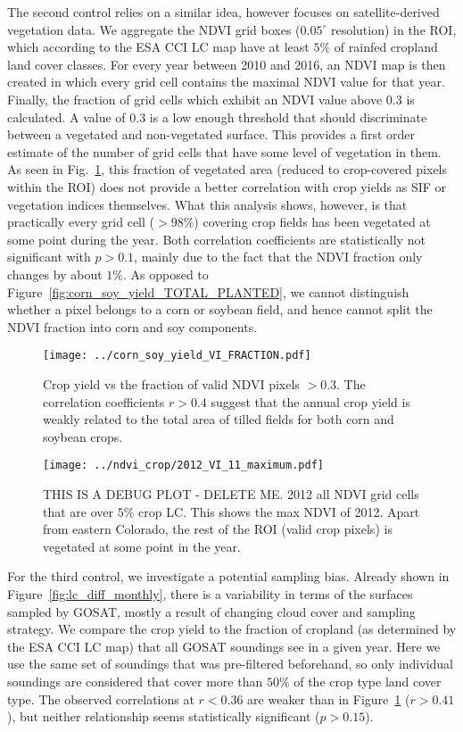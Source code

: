 \documentclass[preprint, a4paper, 10pt, times, 5p]{elsarticle}
\begin{document}
The second control relies on a similar idea, however focuses on satellite-derived vegetation data. We aggregate the NDVI grid boxes ($0.05^\circ$ resolution) in the ROI, which according to the ESA CCI LC map have at least $5\%$ of rainfed cropland land cover classes. For every year between 2010 and 2016, an NDVI map is then created in which every grid cell contains the maximal NDVI value for that year. Finally, the fraction of grid cells which exhibit an NDVI value above $0.3$ is calculated. A value of $0.3$ is a low enough threshold that should discriminate between a vegetated and non-vegetated surface. This provides a first order estimate of the number of grid cells that have some level of vegetation in them. As seen in Fig.~\ref{fig:corn_soy_yield_VI_FRACTION}, this fraction of vegetated area (reduced to crop-covered pixels within the ROI) does not provide a better correlation with crop yields as SIF or vegetation indices themselves. What this analysis shows, however, is that practically every grid cell ($>98\%$) covering crop fields has been vegetated at some point during the year. Both correlation coefficients are statistically not significant with $p > 0.1$, mainly due to the fact that the NDVI fraction only changes by about $1\%$. As opposed to Figure~\ref{fig:corn_soy_yield_TOTAL_PLANTED}, we cannot distinguish whether a pixel belongs to a corn or soybean field, and hence cannot split the NDVI fraction into corn and soy components.

\begin{figure}[htbp]
\centering
\texttt{[image: ../corn\_soy\_yield\_VI\_FRACTION.pdf]}
\caption{Crop yield vs the fraction of valid NDVI pixels $> 0.3$. The correlation coefficients $r > 0.4$ suggest that the annual crop yield is weakly related to the total area of tilled fields for both corn and soybean crops.}
\label{fig:corn_soy_yield_VI_FRACTION}
\end{figure}

\begin{figure}[htbp]
\centering
\texttt{[image: ../ndvi\_crop/2012\_VI\_11\_maximum.pdf]}
\caption{THIS IS A DEBUG PLOT - DELETE ME. 2012 all NDVI grid cells that are over $5\%$ crop LC. This shows the max NDVI of 2012. Apart from eastern Colorado, the rest of the ROI (valid crop pixels) is vegetated at some point in the year.}
\label{fig:debug1}
\end{figure}

For the third control, we investigate a potential sampling bias. Already shown in Figure~\ref{fig:lc_diff_monthly}, there is a variability in terms of the surfaces sampled by GOSAT, mostly a result of changing cloud cover and sampling strategy. We compare the crop yield to the fraction of cropland (as determined by the ESA CCI LC map) that all GOSAT soundings see in a given year. Here we use the same set of soundings that was pre-filtered beforehand, so only individual soundings are considered that cover more than $50\%$ of the crop type land cover type. The observed correlations at $r < 0.36$ are weaker than in Figure~\ref{fig:corn_soy_yield_VI_FRACTION} ($r > 0.41$), but neither relationship seems statistically significant ($p > 0.15$).
\end{document}
